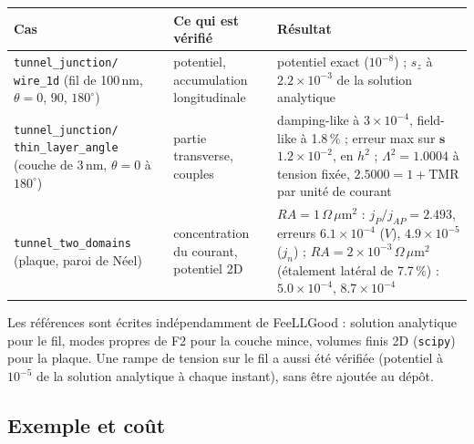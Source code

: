 \documentclass[11pt,a4paper]{article}
\newcommand{\vs}{\bm{s}}
\begin{document}
\begin{center}
\renewcommand{\arraystretch}{1.2}
\small
\begin{tabular}{>{\raggedright}p{3.6cm}>{\raggedright}p{4.6cm}>{\raggedright\arraybackslash}p{6.0cm}}
  \toprule
  \textbf{Cas} & \textbf{Ce qui est vérifié} & \textbf{Résultat} \\
  \midrule
  \texttt{tunnel\_junction/ wire\_1d} (fil de 100\,nm, $\theta = 0$, 90,
    $180^\circ$) & potentiel, accumulation longitudinale & potentiel exact
    ($10^{-8}$) ; $s_z$ à $2.2\times10^{-3}$ de la solution analytique \\
  \texttt{tunnel\_junction/ thin\_layer\_angle} (couche de 3\,nm,
    $\theta = 0$ à $180^\circ$) & partie transverse, couples & damping-like à
    $3\times10^{-4}$, field-like à 1.8\,\% ; erreur max sur $\vs$
    $1.2\times10^{-2}$, en $h^2$ ; $\Lambda^2 = 1.0004$ à tension fixée,
    $2.5000 = 1+\mathrm{TMR}$ par unité de courant \\
  \texttt{tunnel\_two\_domains} (plaque, paroi de Néel) & concentration du
    courant, potentiel 2D & $RA = 1\,\Omega\,\mu$m$^2$ : $j_P/j_{AP} = 2.493$,
    erreurs $6.1\times10^{-4}$ ($V$), $4.9\times10^{-5}$ ($j_n$) ;
    $RA = 2\times10^{-3}\,\Omega\,\mu$m$^2$ (étalement latéral de
    7.7\,\%) : $5.0\times10^{-4}$, $8.7\times10^{-4}$ \\
  \bottomrule
\end{tabular}
\end{center}
Les références sont écrites indépendamment de FeeLLGood : solution
analytique pour le fil, modes propres de F2 pour la couche mince, volumes
finis 2D (\texttt{scipy}) pour la plaque. Une rampe de tension sur le fil a
aussi été vérifiée (potentiel à $10^{-5}$ de la solution analytique à
chaque instant), sans être ajoutée au dépôt.

\subsection{Exemple et coût}
\end{document}
